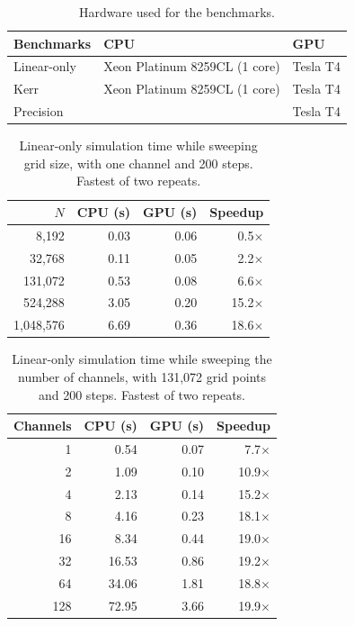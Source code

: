 \begin{table}[H]
  \centering
  \caption{Hardware used for the benchmarks.}
  \begin{tabular}{lll}
    \toprule
    Benchmarks & CPU & GPU \\
    \midrule
    Linear-only & Xeon Platinum 8259CL (1 core) & Tesla T4 \\
    Kerr & Xeon Platinum 8259CL (1 core) & Tesla T4 \\
    Precision & & Tesla T4 \\
    \bottomrule
  \end{tabular}
\end{table}

\begin{table}[H]
  \centering
  \caption{Linear-only simulation time while sweeping grid size, with one channel and 200 steps.
  Fastest of two repeats.}
  \begin{tabular}{rrrr}
    \toprule
    $N$ & CPU (s) & GPU (s) & Speedup \\
    \midrule
    8,192 & 0.03 & 0.06 & 0.5$\times$ \\
    32,768 & 0.11 & 0.05 & 2.2$\times$ \\
    131,072 & 0.53 & 0.08 & 6.6$\times$ \\
    524,288 & 3.05 & 0.20 & 15.2$\times$ \\
    1,048,576 & 6.69 & 0.36 & 18.6$\times$ \\
    \bottomrule
  \end{tabular}
\end{table}

\begin{table}[H]
  \centering
  \caption{Linear-only simulation time while sweeping the number of channels, with 131,072 grid
  points and 200 steps. Fastest of two repeats.}
  \begin{tabular}{rrrr}
    \toprule
    Channels & CPU (s) & GPU (s) & Speedup \\
    \midrule
    1 & 0.54 & 0.07 & 7.7$\times$ \\
    2 & 1.09 & 0.10 & 10.9$\times$ \\
    4 & 2.13 & 0.14 & 15.2$\times$ \\
    8 & 4.16 & 0.23 & 18.1$\times$ \\
    16 & 8.34 & 0.44 & 19.0$\times$ \\
    32 & 16.53 & 0.86 & 19.2$\times$ \\
    64 & 34.06 & 1.81 & 18.8$\times$ \\
    128 & 72.95 & 3.66 & 19.9$\times$ \\
    \bottomrule
  \end{tabular}
\end{table}

